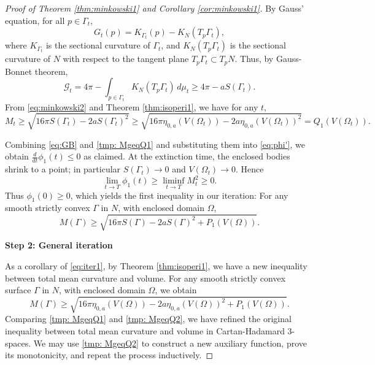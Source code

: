 \documentclass[11pt]{amsart}
\theoremstyle{definition}
\newcommand{\G}{\mathcal{G}}
\theoremstyle{remark}
\numberwithin{equation}{section}
\begin{document}
\begin{proof}[Proof of Theorem \ref{thm:minkowski1} and Corollary \ref{cor:minkowski1}]
	By Gauss' equation, for all $p\in\Gamma_t$, 
	\begin{equation}\label{eq:gauss}
	G_t(p)=K_{\Gamma_t}(p)-K_N(T_p\Gamma_t),
	\end{equation}
	where $K_{\Gamma_t}$ is the sectional curvature of $\Gamma_t$, and $K_N(T_p\Gamma_t)$ is the sectional curvature of $N$ with respect to the tangent plane $T_p \Gamma_t\subset T_p N$.   Thus, by Gauss-Bonnet theorem, 
	\begin{equation}\label{eq:GB}
	\G_t=4\pi -\int_{p\in\Gamma_t} K_N(T_p\Gamma_t)\,d\mu_t\geq 4\pi-aS(\Gamma_t) .
	\end{equation}
	From \eqref{eq:minkowski2} and Theorem \ref{thm:isoperi1}, we have for any $t$, 
	\begin{equation}\label{tmp: MgeqQ1}
		M_t \geq \sqrt{16\pi S(\Gamma_t)- 2 a S(\Gamma_t)^2} \geq 
		\sqrt{16\pi \eta_{0,a}(V(\Omega_t))- 2 a \eta_{0,a}(V(\Omega_t))^2}
		= Q_1(V(\Omega_t)).
	\end{equation}
	
	Combining \eqref{eq:GB} and \eqref{tmp: MgeqQ1} and substituting them into \eqref{eq:phi'}, we obtain $\frac{d}{dt} \phi_1(t)\leq 0$ as claimed. At the extinction time, the enclosed bodies shrink to a point; in particular \(S(\Gamma_t)\to0\) and \(V(\Omega_t)\to0\). Hence
	$$
	\lim_{t\to T}\phi_1(t) \geq \liminf_{t\to T} M_t^2\geq 0.
	$$ 
	Thus $\phi_1(0)\geq 0$, which yields the first inequality in our iteration: For any smooth strictly convex $\Gamma$ in $N$, with enclosed domain $\Omega$,
	\begin{equation}\label{eq:iter1}
		M(\Gamma) \geq \sqrt{16\pi S(\Gamma) -2 a S(\Gamma)^2 + P_1(V(\Omega))}.
	\end{equation}
	
	\textbf{Step 2: General iteration}
	
	As a corollary of \eqref{eq:iter1}, by Theorem \ref{thm:isoperi1}, we have a new inequality between total mean curvature and volume. For any smooth strictly convex surface $\Gamma$ in $N$, with enclosed domain $\Omega$, we obtain
	\begin{equation}\label{tmp: MgeqQ2}
		M(\Gamma) \geq \sqrt{16\pi \eta_{0,a}(V(\Omega)) -2 a \eta_{0,a}(V(\Omega))^2 + P_1(V(\Omega))}.
	\end{equation} 
	Comparing \eqref{tmp: MgeqQ1} and \eqref{tmp: MgeqQ2}, we have refined the original inequality between total mean curvature and volume in Cartan-Hadamard 3-spaces. We may use \eqref{tmp: MgeqQ2} to construct a new auxiliary function, prove its monotonicity, and repeat the process inductively. 
	

\end{proof}
\end{document}
